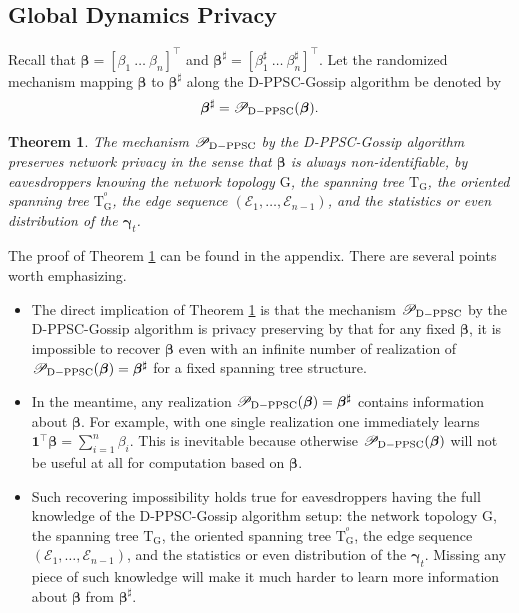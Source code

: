 \documentclass[a4paper, 11pt]{article}
\newcommand{\1}{\mathbf{1}}
\newcommand{\asf}{\mathcal{E}}
\newcommand{\mG}{\mathrm{G}}
\newcommand{\mT}{\mathrm{T}}
\newcommand{\mTG}{\mT^{^o}_{\mG}}
\newcommand{\gammab}{{\bm \gamma}}
\newcommand{\betab}{\bm{\beta}}
\newtheorem{theorem}{Theorem}
\begin{document}
\subsection{Global Dynamics Privacy}
Recall that  $\betab=[\beta_1\ \dots\ \beta_n]^\top$ and $\betab^\sharp=[\beta_1^\sharp\ \dots\ \beta_n^\sharp]^\top$. Let the randomized  mechanism mapping $\betab$ to $\betab^\sharp$ along the  D-PPSC-Gossip algorithm
be denoted by 
\begin{align}
\betab^\sharp= \mathscr{P}_{\rm D-PPSC} (\betab). 
\end{align}
\begin{theorem}\label{thm0}
	The mechanism  $\mathscr{P}_{\rm D-PPSC}$ by the D-PPSC-Gossip algorithm preserves network privacy in the sense that $\betab$ is always non-identifiable,  by eavesdroppers knowing the network topology $\mG$, the spanning tree $\mT_\mG$, the oriented spanning tree $\mTG$,   the edge sequence $(\asf_1,\dots,\asf_{n-1 })$, and the statistics or even distribution  of the $\gammab_t$. 
\end{theorem}
The proof of Theorem   \ref{thm0} can be found in the appendix. 
There are several points worth emphasizing. 
\begin{itemize}
	\item  The direct implication of Theorem \ref{thm0} is that the mechanism  $\mathscr{P}_{\rm D-PPSC}$ by the D-PPSC-Gossip algorithm  is privacy preserving by that for any fixed $\betab$, it is impossible to recover  $\betab$ even with an infinite number of realization of  $\mathscr{P}_{\rm D-PPSC} (\betab)=\betab^\sharp$ for a fixed spanning tree structure.
	
	\item In the meantime,   any realization $\mathscr{P}_{\rm D-PPSC} (\betab)=\betab^\sharp$   contains information about $\betab$. For example, with one single realization one immediately learns $\mathbf{1}^\top \betab =\sum_{i=1}^n \beta
	_i$. This is inevitable because otherwise  $\mathscr{P}_{\rm D-PPSC} (\betab)$ will not be useful at all for computation based on $\betab$.
	\item Such recovering impossibility holds true for eavesdroppers having the full knowledge of the D-PPSC-Gossip algorithm setup: the network topology $\mG$, the spanning tree $\mT_\mG$, the oriented spanning tree $\mTG$,   the edge sequence $(\asf_1,\dots,\asf_{n-1 })$, and the statistics or even distribution  of the $\gammab_t$. Missing any piece of such knowledge will make it much harder to learn more information about $\betab$ from $\betab^\sharp$.  
\end{itemize}
\end{document}
